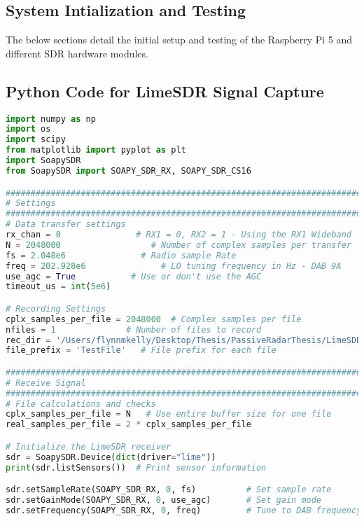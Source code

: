 \begin{appendices}
\cleardoublepage

\chapter{System Intialization and Testing}

The below sections detail the initial setup and testing of the Raspberry Pi 5 and different SDR hardware modules.

\section{Python Code for LimeSDR Signal Capture \label{app:limeSDRscript}}
\begin{lstlisting}[language=Python, caption={Python code for capturing DAB signal using LimeSDR}, label={lst:limeSDR_code}]
import numpy as np
import os
import scipy
from matplotlib import pyplot as plt
import SoapySDR
from SoapySDR import SOAPY_SDR_RX, SOAPY_SDR_CS16

########################################################################################
# Settings
########################################################################################
# Data transfer settings
rx_chan = 0               # RX1 = 0, RX2 = 1 - Using the RX1 Wideband
N = 2048000                  # Number of complex samples per transfer
fs = 2.048e6               # Radio sample Rate
freq = 202.928e6               # LO tuning frequency in Hz - DAB 9A
use_agc = True           # Use or don't use the AGC
timeout_us = int(5e6)

# Recording Settings
cplx_samples_per_file = 2048000  # Complex samples per file
nfiles = 1              # Number of files to record
rec_dir = '/Users/flynnmkelly/Desktop/Thesis/PassiveRadarThesis/LimeSDR'  # Location of drive for recording
file_prefix = 'TestFile'   # File prefix for each file

########################################################################################
# Receive Signal
########################################################################################
# File calculations and checks
cplx_samples_per_file = N   # Use entire buffer size for one file
real_samples_per_file = 2 * cplx_samples_per_file

# Initialize the LimeSDR receiver
sdr = SoapySDR.Device(dict(driver="lime"))
print(sdr.listSensors())  # Print sensor information

sdr.setSampleRate(SOAPY_SDR_RX, 0, fs)          # Set sample rate
sdr.setGainMode(SOAPY_SDR_RX, 0, use_agc)       # Set gain mode
sdr.setFrequency(SOAPY_SDR_RX, 0, freq)         # Tune to DAB frequency


\end{lstlisting}
\end{appendices}
